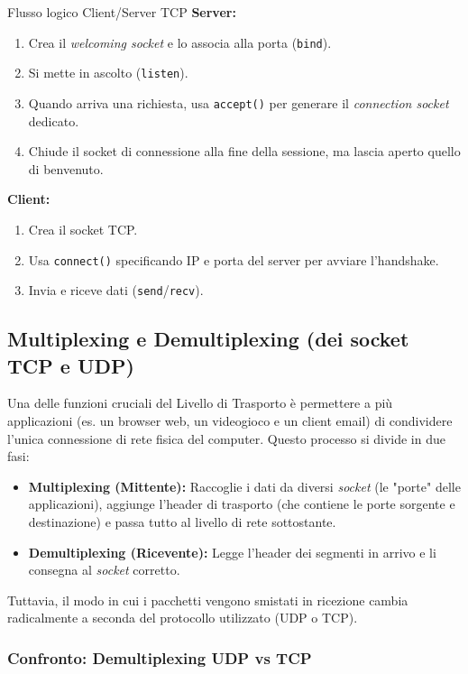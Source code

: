 \documentclass[a4paper,12pt]{report}
\begin{document}
\begin{esempiobox}{Flusso logico Client/Server TCP}
\textbf{Server:}
\begin{enumerate}
    \item Crea il \textit{welcoming socket} e lo associa alla porta (\texttt{bind}).
    \item Si mette in ascolto (\texttt{listen}).
    \item Quando arriva una richiesta, usa \texttt{accept()} per generare il \textit{connection socket} dedicato.
    \item Chiude il socket di connessione alla fine della sessione, ma lascia aperto quello di benvenuto.
\end{enumerate}
\textbf{Client:}
\begin{enumerate}
    \item Crea il socket TCP.
    \item Usa \texttt{connect()} specificando IP e porta del server per avviare l'handshake.
    \item Invia e riceve dati (\texttt{send}/\texttt{recv}).
\end{enumerate}
\end{esempiobox}

\newpage
\newpage
\subsection{Multiplexing e Demultiplexing (dei socket TCP e UDP)}

Una delle funzioni cruciali del Livello di Trasporto è permettere a più applicazioni (es. un browser web, un videogioco e un client email) di condividere l'unica connessione di rete fisica del computer. Questo processo si divide in due fasi:
\begin{itemize}[leftmargin=*]
    \item \textbf{Multiplexing (Mittente):} Raccoglie i dati da diversi \textit{socket} (le "porte" delle applicazioni), aggiunge l'header di trasporto (che contiene le porte sorgente e destinazione) e passa tutto al livello di rete sottostante.
    \item \textbf{Demultiplexing (Ricevente):} Legge l'header dei segmenti in arrivo e li consegna al \textit{socket} corretto.
\end{itemize}

Tuttavia, il modo in cui i pacchetti vengono smistati in ricezione cambia radicalmente a seconda del protocollo utilizzato (UDP o TCP).

\subsubsection{Confronto: Demultiplexing UDP vs TCP}
\end{document}
